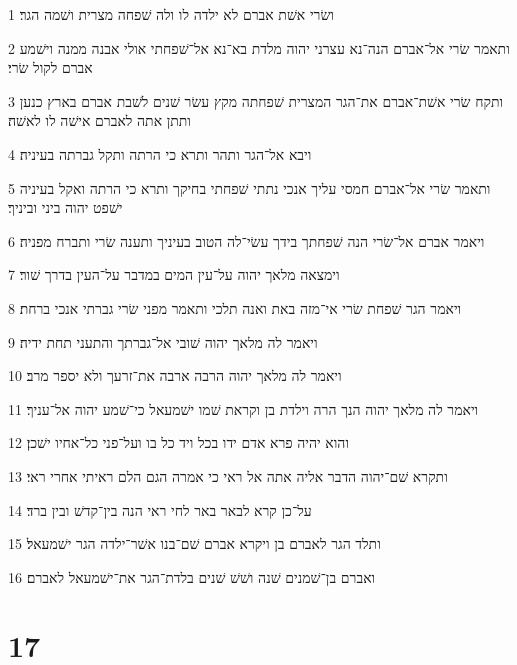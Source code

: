 \par 1 ושׂרי אשׁת אברם לא ילדה לו ולה שׁפחה מצרית ושׁמה הגר׃
\par 2 ותאמר שׂרי אל־אברם הנה־נא עצרני יהוה מלדת בא־נא אל־שׁפחתי אולי אבנה ממנה וישׁמע אברם לקול שׂרי׃
\par 3 ותקח שׂרי אשׁת־אברם את־הגר המצרית שׁפחתה מקץ עשׂר שׁנים לשׁבת אברם בארץ כנען ותתן אתה לאברם אישׁה לו לאשׁה׃
\par 4 ויבא אל־הגר ותהר ותרא כי הרתה ותקל גברתה בעיניה׃
\par 5 ותאמר שׂרי אל־אברם חמסי עליך אנכי נתתי שׁפחתי בחיקך ותרא כי הרתה ואקל בעיניה ישׁפט יהוה ביני וביניך׃
\par 6 ויאמר אברם אל־שׂרי הנה שׁפחתך בידך עשׂי־לה הטוב בעיניך ותענה שׂרי ותברח מפניה׃
\par 7 וימצאה מלאך יהוה על־עין המים במדבר על־העין בדרך שׁור׃
\par 8 ויאמר הגר שׁפחת שׂרי אי־מזה באת ואנה תלכי ותאמר מפני שׂרי גברתי אנכי ברחת׃
\par 9 ויאמר לה מלאך יהוה שׁובי אל־גברתך והתעני תחת ידיה׃
\par 10 ויאמר לה מלאך יהוה הרבה ארבה את־זרעך ולא יספר מרב׃
\par 11 ויאמר לה מלאך יהוה הנך הרה וילדת בן וקראת שׁמו ישׁמעאל כי־שׁמע יהוה אל־עניך׃
\par 12 והוא יהיה פרא אדם ידו בכל ויד כל בו ועל־פני כל־אחיו ישׁכן׃
\par 13 ותקרא שׁם־יהוה הדבר אליה אתה אל ראי כי אמרה הגם הלם ראיתי אחרי ראי׃
\par 14 על־כן קרא לבאר באר לחי ראי הנה בין־קדשׁ ובין ברד׃
\par 15 ותלד הגר לאברם בן ויקרא אברם שׁם־בנו אשׁר־ילדה הגר ישׁמעאל׃
\par 16 ואברם בן־שׁמנים שׁנה ושׁשׁ שׁנים בלדת־הגר את־ישׁמעאל לאברם׃

\chapter{17}

